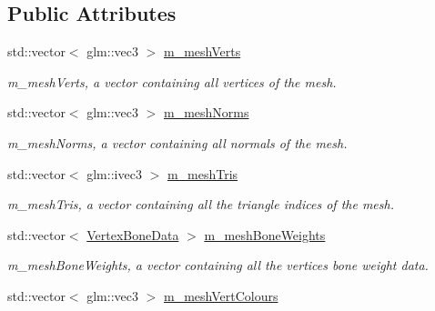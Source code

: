 \subsection*{Public Attributes}
\begin{DoxyCompactItemize}
\item 
std\+::vector$<$ glm\+::vec3 $>$ \hyperlink{classMesh_aa409beb8a6df4709baf7b47beac9581d}{m\+\_\+mesh\+Verts}\hypertarget{classMesh_aa409beb8a6df4709baf7b47beac9581d}{}\label{classMesh_aa409beb8a6df4709baf7b47beac9581d}

\begin{DoxyCompactList}\small\item\em m\+\_\+mesh\+Verts, a vector containing all vertices of the mesh. \end{DoxyCompactList}\item 
std\+::vector$<$ glm\+::vec3 $>$ \hyperlink{classMesh_afdd4c5d1d7e19176a1919cc6890db137}{m\+\_\+mesh\+Norms}\hypertarget{classMesh_afdd4c5d1d7e19176a1919cc6890db137}{}\label{classMesh_afdd4c5d1d7e19176a1919cc6890db137}

\begin{DoxyCompactList}\small\item\em m\+\_\+mesh\+Norms, a vector containing all normals of the mesh. \end{DoxyCompactList}\item 
std\+::vector$<$ glm\+::ivec3 $>$ \hyperlink{classMesh_ab69b200bd81cee173a6226b290c5e3a6}{m\+\_\+mesh\+Tris}\hypertarget{classMesh_ab69b200bd81cee173a6226b290c5e3a6}{}\label{classMesh_ab69b200bd81cee173a6226b290c5e3a6}

\begin{DoxyCompactList}\small\item\em m\+\_\+mesh\+Tris, a vector containing all the triangle indices of the mesh. \end{DoxyCompactList}\item 
std\+::vector$<$ \hyperlink{structVertexBoneData}{Vertex\+Bone\+Data} $>$ \hyperlink{classMesh_aa7d497de323ddfe418e4b8cf5ee9d549}{m\+\_\+mesh\+Bone\+Weights}\hypertarget{classMesh_aa7d497de323ddfe418e4b8cf5ee9d549}{}\label{classMesh_aa7d497de323ddfe418e4b8cf5ee9d549}

\begin{DoxyCompactList}\small\item\em m\+\_\+mesh\+Bone\+Weights, a vector containing all the vertices bone weight data. \end{DoxyCompactList}\item 
std\+::vector$<$ glm\+::vec3 $>$ \hyperlink{classMesh_a0ef923278d71ec31675d8bc2c16e2ab5}{m\+\_\+mesh\+Vert\+Colours}\hypertarget{classMesh_a0ef923278d71ec31675d8bc2c16e2ab5}{}\label{classMesh_a0ef923278d71ec31675d8bc2c16e2ab5}


\end{DoxyCompactItemize}
